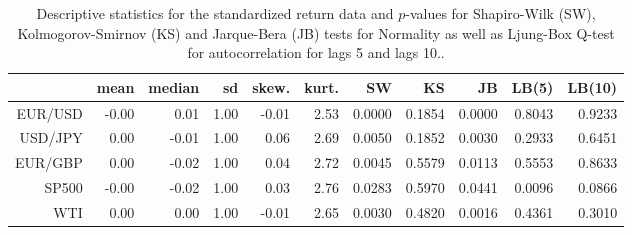 \begin{table}[ht]
\centering
\begin{tabular}{rrrrrrrrrrr}
  \hline
 & mean & median & sd & skew. & kurt. & SW & KS & JB & LB(5) & LB(10) \\ 
  \hline
EUR/USD & -0.00 & 0.01 & 1.00 & -0.01 & 2.53 & 0.0000 & 0.1854 & 0.0000 & 0.8043 & 0.9233 \\ 
  USD/JPY & 0.00 & -0.01 & 1.00 & 0.06 & 2.69 & 0.0050 & 0.1852 & 0.0030 & 0.2933 & 0.6451 \\ 
  EUR/GBP & 0.00 & -0.02 & 1.00 & 0.04 & 2.72 & 0.0045 & 0.5579 & 0.0113 & 0.5553 & 0.8633 \\ 
  SP500 & -0.00 & -0.02 & 1.00 & 0.03 & 2.76 & 0.0283 & 0.5970 & 0.0441 & 0.0096 & 0.0866 \\ 
  WTI & 0.00 & 0.00 & 1.00 & -0.01 & 2.65 & 0.0030 & 0.4820 & 0.0016 & 0.4361 & 0.3010 \\ 
   \hline
\end{tabular}
\caption{Descriptive statistics for the standardized return data and
              $p$-values for  Shapiro-Wilk (SW), Kolmogorov-Smirnov (KS) and 
             Jarque-Bera (JB) tests for Normality as well as Ljung-Box Q-test
             for autocorrelation for lags 5 and lags 10..} 
\label{table:standrets_desc_EX}
\end{table}
